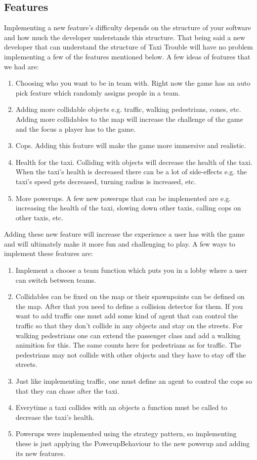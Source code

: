 \subsection*{Features}
Implementing a new feature's difficulty depends on the structure of your software and how much the developer understands this structure. That being said a new developer that can understand the structure of Taxi Trouble will have no problem implementing a few of the features mentioned below. A few ideas of features that we had are:
\begin{enumerate}
\item Choosing who you want to be in team with. Right now the game has an auto pick feature which randomly assigns people in a team.
\item Adding more collidable objects e.g. traffic, walking pedestrians, cones, etc. Adding more collidables to the map will increase the challenge of the game and the focus a player has to the game.
\item Cops. Adding this feature will make the game more immersive and realistic.
\item Health for the taxi. Colliding with objects will decrease the health of the taxi. When the taxi's health is decreased there can be a lot of side-effects e.g. the taxi's speed gets decreased, turning radius is increased, etc.
\item More powerups. A few new powerups that can be implemented are e.g. increasing the health of the taxi, slowing down other taxis, calling cops on other taxis, etc.
\end{enumerate}
Adding these new feature will increase the experience a user has with the game and will ultimately make it more fun and challenging to play. A few ways to implement these features are:
\begin{enumerate}	
\item Implement a choose a team function which puts you in a lobby where a user can switch between teams.
\item Collidables can be fixed on the map or their spawnpoints can be defined on the map. After that you need to define a collision detector for them. If you want to add traffic one must add some kind of agent that can control the traffic so that they don't collide in any objects and stay on the streets. For walking pedestrians one can extend the passenger class and add a walking animition for this. The same counts here for pedestrians as for traffic. The pedestrians may not collide with other objects and they have to stay off the streets.
\item Just like implementing traffic, one must define an agent to control the cops so that they can chase after the taxi.
\item Everytime a taxi collides with an objects a function must be called to decrease the taxi's health.
\item Powerups were implemented using the strategy pattern, so implementing these is just applying the PowerupBehaviour to the new powerup and adding its new features.
\end{enumerate}
